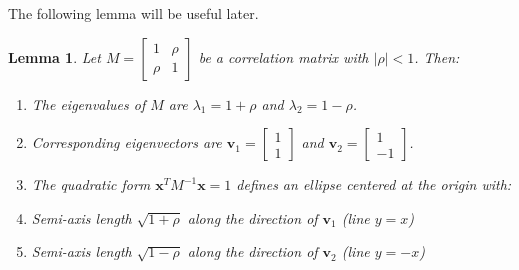 \documentclass{article}
\newtheorem{lemma}{Lemma}
\begin{document}
The following lemma will be useful later.

\begin{lemma}
Let $M = \begin{bmatrix} 1 & \rho \\ \rho & 1 \end{bmatrix}$ be a correlation matrix with $|\rho| < 1$. Then:
\begin{enumerate}
    \item The eigenvalues of $M$ are $\lambda_1 = 1 + \rho$ and $\lambda_2 = 1 - \rho$.
    \item Corresponding eigenvectors are $\mathbf{v}_1 = \begin{bmatrix} 1 \\ 1 \end{bmatrix}$ and $\mathbf{v}_2 = \begin{bmatrix} 1 \\ -1 \end{bmatrix}$.
    \item The quadratic form $\mathbf{x}^T M^{-1} \mathbf{x} = 1$ defines an ellipse centered at the origin with:
    \item Semi-axis length $\sqrt{1+\rho}$ along the direction of $\mathbf{v}_1$ (line $y = x$)
        \item Semi-axis length $\sqrt{1-\rho}$ along the direction of $\mathbf{v}_2$ (line $y = -x$)
\end{enumerate}
\end{lemma}
\end{document}
